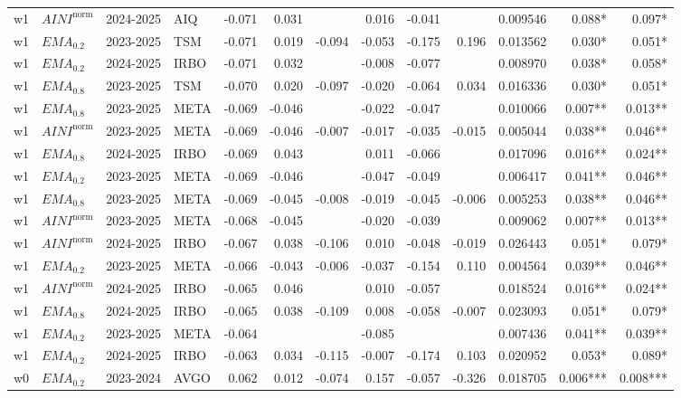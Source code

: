 \begin{tabular}{@{}llllrrrrrrrrr@{}}
w1 & $AINI^{\mathrm{norm}}$ & 2024-2025 & AIQ & -0.071 & 0.031 &  & 0.016 & -0.041 &  & 0.009546 & 0.088* & 0.097* \\
w1 & $EMA_{0.2}$ & 2023-2025 & TSM & -0.071 & 0.019 & -0.094 & -0.053 & -0.175 & 0.196 & 0.013562 & 0.030* & 0.051* \\
w1 & $EMA_{0.2}$ & 2024-2025 & IRBO & -0.071 & 0.032 &  & -0.008 & -0.077 &  & 0.008970 & 0.038* & 0.058* \\
w1 & $EMA_{0.8}$ & 2023-2025 & TSM & -0.070 & 0.020 & -0.097 & -0.020 & -0.064 & 0.034 & 0.016336 & 0.030* & 0.051* \\
w1 & $EMA_{0.8}$ & 2023-2025 & META & -0.069 & -0.046 &  & -0.022 & -0.047 &  & 0.010066 & 0.007** & 0.013** \\
w1 & $AINI^{\mathrm{norm}}$ & 2023-2025 & META & -0.069 & -0.046 & -0.007 & -0.017 & -0.035 & -0.015 & 0.005044 & 0.038** & 0.046** \\
w1 & $EMA_{0.8}$ & 2024-2025 & IRBO & -0.069 & 0.043 &  & 0.011 & -0.066 &  & 0.017096 & 0.016** & 0.024** \\
w1 & $EMA_{0.2}$ & 2023-2025 & META & -0.069 & -0.046 &  & -0.047 & -0.049 &  & 0.006417 & 0.041** & 0.046** \\
w1 & $EMA_{0.8}$ & 2023-2025 & META & -0.069 & -0.045 & -0.008 & -0.019 & -0.045 & -0.006 & 0.005253 & 0.038** & 0.046** \\
w1 & $AINI^{\mathrm{norm}}$ & 2023-2025 & META & -0.068 & -0.045 &  & -0.020 & -0.039 &  & 0.009062 & 0.007** & 0.013** \\
w1 & $AINI^{\mathrm{norm}}$ & 2024-2025 & IRBO & -0.067 & 0.038 & -0.106 & 0.010 & -0.048 & -0.019 & 0.026443 & 0.051* & 0.079* \\
w1 & $EMA_{0.2}$ & 2023-2025 & META & -0.066 & -0.043 & -0.006 & -0.037 & -0.154 & 0.110 & 0.004564 & 0.039** & 0.046** \\
w1 & $AINI^{\mathrm{norm}}$ & 2024-2025 & IRBO & -0.065 & 0.046 &  & 0.010 & -0.057 &  & 0.018524 & 0.016** & 0.024** \\
w1 & $EMA_{0.8}$ & 2024-2025 & IRBO & -0.065 & 0.038 & -0.109 & 0.008 & -0.058 & -0.007 & 0.023093 & 0.051* & 0.079* \\
w1 & $EMA_{0.2}$ & 2023-2025 & META & -0.064 &  &  & -0.085 &  &  & 0.007436 & 0.041** & 0.039** \\
w1 & $EMA_{0.2}$ & 2024-2025 & IRBO & -0.063 & 0.034 & -0.115 & -0.007 & -0.174 & 0.103 & 0.020952 & 0.053* & 0.089* \\
w0 & $EMA_{0.2}$ & 2023-2024 & AVGO & 0.062 & 0.012 & -0.074 & 0.157 & -0.057 & -0.326 & 0.018705 & 0.006*** & 0.008*** \\

\end{tabular}
